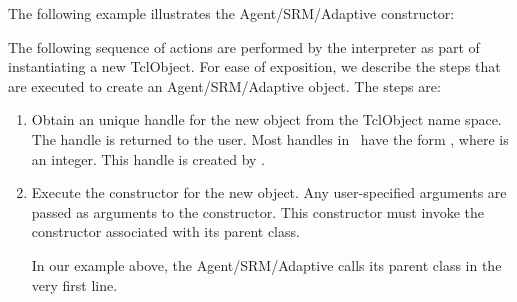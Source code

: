 The following example illustrates the Agent/SRM/Adaptive constructor:

The following sequence of actions are performed by the interpreter
as part of instantiating a new TclObject.
For ease of exposition, we describe the steps that are executed
to create an Agent/SRM/Adaptive object.
The steps are:
\begin{enumerate}
\item
  Obtain an unique handle for the new object   from the TclObject name space.
  The handle is returned to the user.
  Most handles in \ns\ have the form , where 
  is an integer.  This handle is created by
  .
\item Execute the constructor for the new object.
  Any user-specified arguments are passed as arguments to the constructor.
  This constructor must invoke the constructor
  associated with its parent class.

  In our example above, the Agent/SRM/Adaptive calls its parent class
  in the very first line.  


\end{enumerate}
